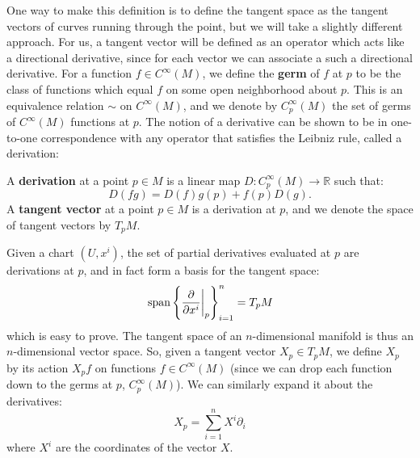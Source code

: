 One way to make this definition is to define the tangent space as the tangent vectors of curves running through the point, but 
we will take a slightly different approach. For us, a tangent vector will be defined as an operator which acts like a directional 
derivative, since for each vector we can associate a such a directional derivative. For a function $f\in C^\infty(M)$, we define 
the \textbf{germ} of $f$ at $p$ to be the class of functions which equal $f$ on some open neighborhood about $p$. This is 
an equivalence relation $\sim$ on $C^\infty(M)$, and we denote by $C_p^\infty(M)$ the set of germs of $C^\infty(M)$ functions 
at $p$. The notion of a derivative can be shown to be in one-to-one correspondence with any operator that satisfies the 
Leibniz rule, called a derivation:
\begin{definition}
	A \textbf{derivation} at a point $p\in M$ is a linear map $D : C_p^\infty(M)\rightarrow\mathbb R$ such that:
	\begin{equation}
		D(fg) = D(f) g(p) + f(p) D(g).
	\end{equation}
	A \textbf{tangent vector} at a point $p\in M$ is a derivation at $p$, and we denote the space of tangent vectors by 
	$T_pM$. 
\end{definition}

Given a chart $(U, x^i)$, the set of partial derivatives evaluated at $p$ are derivations at $p$, and in fact form a basis for the tangent space:
\begin{equation}
	\textnormal{span}\left\{\frac{\partial}{\partial x^i}\bigg|_p\right\}_{i = 1}^n = T_p M
\end{equation}
which is easy to prove. The tangent space of an $n$-dimensional manifold is thus an $n$-dimensional vector space. So, given 
a tangent vector $X_p\in T_p M$, we define $X_p$ by its action $X_p f$ on functions $f\in C^\infty(M)$ (since we can drop 
each function down to the germs at $p$, $C_p^\infty(M)$). We can similarly expand it about the derivatives:
\begin{equation}
	X_p = \sum_{i = 1}^n X^i\partial_i
\end{equation}
where $X^i$ are the coordinates of the vector $X$. 

